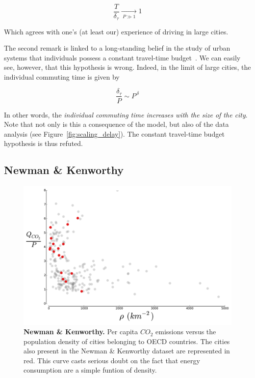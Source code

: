 \begin{equation}
    \displaystyle \frac{T}{\delta_\tau} \xrightarrow[\:P \gg 1\:]{} 1
\end{equation}

Which agrees with one's (at least our) experience of driving in large cities.

The second remark is linked to a long-standing belief in the study of urban
systems that individuals possess a constant travel-time
budget~\cite{Zahavi:1974}. We can easily see, however, that this hypothesis is
wrong. Indeed, in the limit of large cities, the individual commuting time is
given by

\begin{equation}
    \frac{\delta_\tau}{P} \sim P^{\,\delta}
\end{equation}

In other words, the \emph{individual commuting time increases with the size of the
city}. Note that not only is this a consequence of the model, but also of the
data analysis (see Figure~\ref{fig:scaling_delay}). The constant travel-time budget hypothesis is thus refuted.

\subsection{Newman \& Kenworthy}

\begin{figure}
    \centering
    \includegraphics[width=\textwidth]{gfx/chapter-scaling/newman_kenworthy.pdf}
    \caption{{\bf Newman \& Kenworthy.} Per capita $CO_2$ emissions versus the population density of cities
    belonging to OECD countries. The cities also present in the Newman \&
    Kenworthy dataset are represented in red. This curve casts serious doubt on
the fact that energy consumption are a simple funtion of
density.\label{fig:newman_kenworthy}}
\end{figure}

